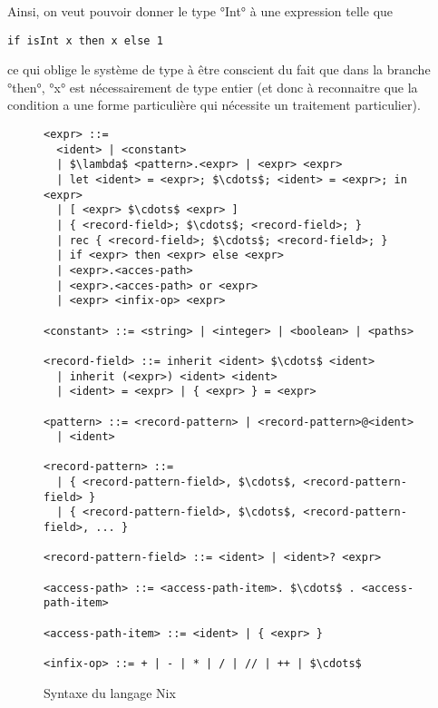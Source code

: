 Ainsi, on veut pouvoir donner le type °Int° à une expression telle que

\begin{lstlisting}
if isInt x then x else 1
\end{lstlisting}

ce qui oblige le système de type à être conscient du fait que dans la branche
°then°, °x° est nécessairement de type entier (et donc à reconnaitre que la
condition a une forme particulière qui nécessite un traitement particulier).

\begin{figure}
  \begin{lstlisting}
<expr> ::=
  <ident> | <constant>
  | $\lambda$ <pattern>.<expr> | <expr> <expr>
  | let <ident> = <expr>; $\cdots$; <ident> = <expr>; in <expr>
  | [ <expr> $\cdots$ <expr> ]
  | { <record-field>; $\cdots$; <record-field>; }
  | rec { <record-field>; $\cdots$; <record-field>; }
  | if <expr> then <expr> else <expr>
  | <expr>.<acces-path>
  | <expr>.<acces-path> or <expr>
  | <expr> <infix-op> <expr>

<constant> ::= <string> | <integer> | <boolean> | <paths>

<record-field> ::= inherit <ident> $\cdots$ <ident>
  | inherit (<expr>) <ident> <ident>
  | <ident> = <expr> | { <expr> } = <expr>

<pattern> ::= <record-pattern> | <record-pattern>@<ident>
  | <ident>

<record-pattern> ::=
  | { <record-pattern-field>, $\cdots$, <record-pattern-field> }
  | { <record-pattern-field>, $\cdots$, <record-pattern-field>, ... }

<record-pattern-field> ::= <ident> | <ident>? <expr>

<access-path> ::= <access-path-item>. $\cdots$ . <access-path-item>

<access-path-item> ::= <ident> | { <expr> }

<infix-op> ::= + | - | * | / | // | ++ | $\cdots$
  \end{lstlisting}
  \caption{Syntaxe du langage Nix\label{nix::syntax}}
\end{figure}


